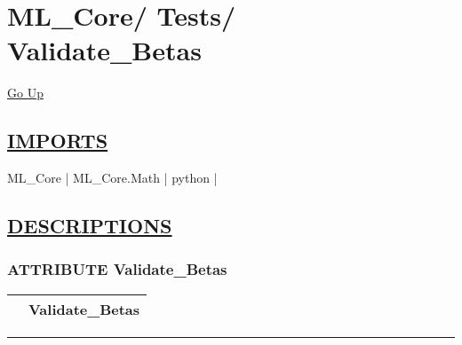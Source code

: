 \chapter*{\color{headfile}
{\large ML\_Core\slash\hspace{0pt}}
{\large Tests\slash\hspace{0pt}}
 \\
Validate_Betas
}
\hypertarget{ecldoc:toc:ML_Core.Tests.Validate_Betas}{}
\hyperlink{ecldoc:toc:root/ML_Core/Tests}{Go Up}

\section*{\underline{\textsf{IMPORTS}}}
\begin{doublespace}
{\large
ML\_Core |
ML\_Core.Math |
python |
}
\end{doublespace}

\section*{\underline{\textsf{DESCRIPTIONS}}}
\subsection*{\textsf{\colorbox{headtoc}{\color{white} ATTRIBUTE}
Validate\_Betas}}

\hypertarget{ecldoc:ml_core.tests.validate_betas}{}

{\renewcommand{\arraystretch}{1.5}
\begin{tabularx}{\textwidth}{|>{\raggedright\arraybackslash}l|X|}
\hline
\hspace{0pt}\mytexttt{\color{red} } & \textbf{Validate\_Betas} \\
\hline
\end{tabularx}
}

\par


\rule{\linewidth}{0.5pt}

